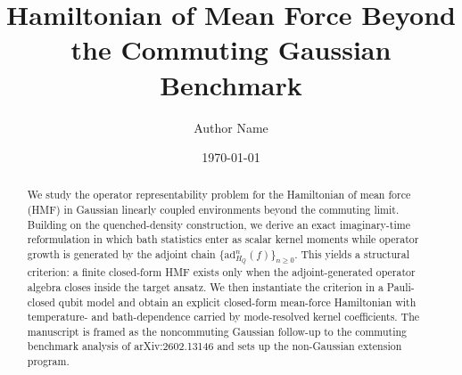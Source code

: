 \documentclass[aps,prl,twocolumn,superscriptaddress,showpacs]{revtex4-2}
\begin{document}
\title{Hamiltonian of Mean Force Beyond the Commuting Gaussian Benchmark}
\author{Author Name}
\date{\today}

\begin{abstract}
We study the operator representability problem for the Hamiltonian of mean force
(HMF) in Gaussian linearly coupled environments beyond the commuting limit.
Building on the quenched-density construction, we derive an exact
imaginary-time reformulation in which bath statistics enter as scalar kernel
moments while operator growth is generated by the adjoint chain
$\{\mathrm{ad}_{H_Q}^{n}(f)\}_{n\ge 0}$. This yields a structural criterion:
a finite closed-form HMF exists only when the adjoint-generated operator
algebra closes inside the target ansatz. We then instantiate the criterion in a
Pauli-closed qubit model and obtain an explicit closed-form mean-force
Hamiltonian with temperature- and bath-dependence carried by mode-resolved
kernel coefficients. The manuscript is framed as the noncommuting Gaussian
follow-up to the commuting benchmark analysis of arXiv:2602.13146 and sets up
the non-Gaussian extension program.
\end{abstract}

\maketitle





% 
% 



% 


\appendix
\setcounter{secnumdepth}{2}


% 




\end{document}
